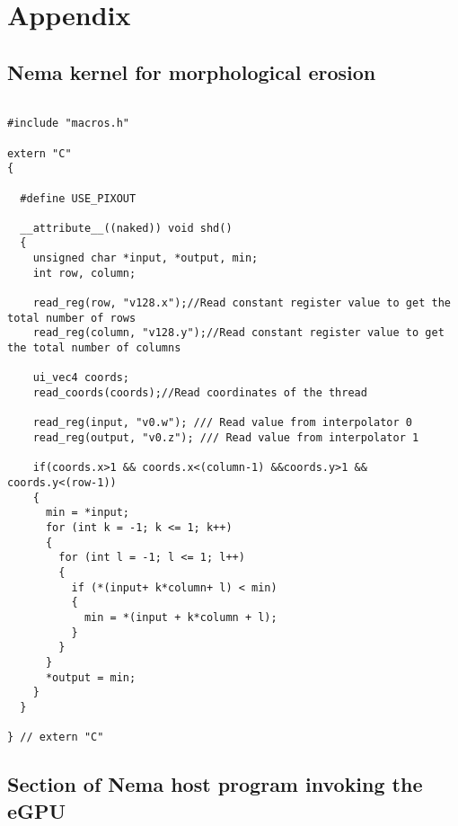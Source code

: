 \chapter{Appendix}
\label{chap:appendix}

\section{Nema kernel for morphological erosion}
\label{s:kerero}

\lstset {language=C++}
\begin{lstlisting}

#include "macros.h"

extern "C" 
{

  #define USE_PIXOUT

  __attribute__((naked)) void shd()
  {
    unsigned char *input, *output, min;
    int row, column;

    read_reg(row, "v128.x");//Read constant register value to get the total number of rows
    read_reg(column, "v128.y");//Read constant register value to get the total number of columns
  
    ui_vec4 coords;
    read_coords(coords);//Read coordinates of the thread
    
    read_reg(input, "v0.w"); /// Read value from interpolator 0
    read_reg(output, "v0.z"); /// Read value from interpolator 1
  
    if(coords.x>1 && coords.x<(column-1) &&coords.y>1 && coords.y<(row-1))
    {
      min = *input;
      for (int k = -1; k <= 1; k++)
      {
        for (int l = -1; l <= 1; l++)
        {
          if (*(input+ k*column+ l) < min)
          {
            min = *(input + k*column + l);
          }
        }
      }
      *output = min;
    }
  }

} // extern "C"

\end{lstlisting}

\hfill \break

\section{Section of Nema host program invoking the eGPU}
\label{s:hostero}

